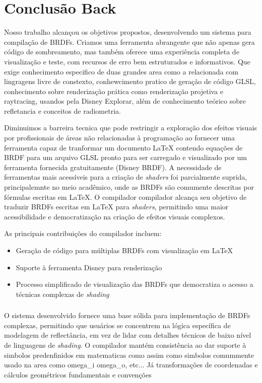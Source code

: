 
\chapter{Conclusão Back} \label{chapter-conclusion}

Nosso trabalho alcançou os objetivos propostos, desenvolvendo um sistema para compilação de BRDFs. Criamos uma ferramenta abrangente que não apenas gera código de sombreamento, mas também oferece uma experiência completa de visualização e teste, com recursos de erro bem estruturados e informativos. Que exige conhecimento especifico de duas grandes area como a relacionada com lingragens livre de constexto, conhewcimento pratico de geração de código GLSL, conhecimento sobre renderização prática como renderização projetiva e raytracing, usandos pela Disney Explorar, além de conhecimento teórico sobre refletancia e conceitos de radiometria.

Diminuimos a barreira tecnica que pode restringir a exploração dos efeitos visuais por profissionais de áreas não relacionadas à programação ao fornecer uma ferramenta capaz de tranformar um documento \LaTeX{} contendo equações de BRDF para um arquivo GLSL pronto para ser carregado e visualizado por um ferramenta fornecida gratuitamente (Disney BRDF). A necessidade de ferramentas mais acessíveis para a criação de \textit{shaders} foi parcialmente suprida, principalemnte no meio acadêmico, onde as BRDFs são comumente descritas por fórmulas escritas em \LaTeX{}. O compilador compilador alcança seu objetivo de traduzir BRDFs escritas em \LaTeX{} para \textit{shaders}, permitindo uma maior acessibilidade e democratização na criação de efeitos visuais complexos.


As principais contribuições do compilador incluem:

\begin{itemize}
    \item Geração de código para múltiplas BRDFs com visualização em \LaTeX{}
    \item Suporte à ferramenta Disney para renderização
    \item Processo simplificado de visualização das BRDFs que democratiza o acesso a técnicas complexas de \textit{shading}
\end{itemize}

\subsection{}

O sistema desenvolvido fornece uma base sólida para implementação de BRDFs complexas, permitindo que usuários se concentrem na lógica específica de modelagem de reflectância, em vez de lidar com detalhes técnicos de baixo nível de linguagens de \textit{shading}. O compilador mantém consistência ao dar suporte à simbolos predenfinidos em matematicas como assim como simbolos comummente usado na  area como omega_i omega_o, etc... Já transformações de coordenadas e cálculos geométricos fundamentais e convenções

